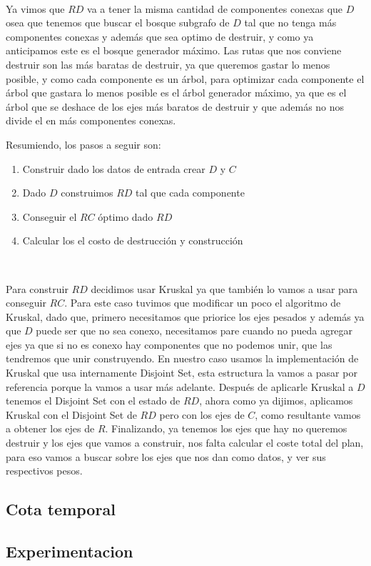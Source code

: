 \\
\par
Ya vimos que $RD$ va a tener la misma cantidad de componentes conexas que $D$ osea que tenemos que buscar el bosque subgrafo de $D$ tal que no tenga más componentes conexas y además que sea optimo de destruir, y como ya anticipamos este es el bosque generador máximo. Las rutas que nos conviene destruir son las más baratas de destruir, ya que queremos gastar lo menos posible, y como cada componente es un árbol, para optimizar cada componente el árbol que gastara lo menos posible es el árbol generador máximo, ya que es el árbol que se deshace de los ejes más baratos de destruir y que  además no nos divide el en más componentes conexas.
\\
\par
Resumiendo, los pasos a seguir son:
\begin{enumerate}
\item Construir dado los datos de entrada crear $D$ y $C$
\item Dado $D$ construimos $RD$ tal que cada componente
\item Conseguir el $RC$ óptimo dado $RD$
\item Calcular los el costo de destrucción y construcción
\end{enumerate}
\\
\par 
Para construir $RD$ decidimos usar Kruskal ya que también lo vamos a usar para conseguir $RC$. Para este caso tuvimos que modificar un poco el algoritmo de Kruskal, dado que, primero necesitamos que priorice los ejes pesados y además ya que $D$ puede ser que no sea conexo, necesitamos pare cuando no pueda agregar ejes ya que si no es conexo hay componentes que no podemos unir, que las tendremos que unir construyendo. En nuestro caso usamos la implementación de Kruskal que usa internamente Disjoint Set, esta estructura la vamos a pasar por referencia porque la vamos a usar más adelante.
Después de aplicarle Kruskal a $D$ tenemos el Disjoint Set con el estado de $RD$, ahora como ya dijimos, aplicamos Kruskal con el Disjoint Set de $RD$ pero con los ejes de $C$, como resultante vamos a obtener los ejes de $R$. Finalizando, ya tenemos los ejes que hay no queremos destruir y los ejes que vamos a construir, nos falta calcular el coste total del plan, para eso vamos a buscar sobre los ejes que nos dan como datos, y ver sus respectivos pesos.



\subsection{Cota temporal}

\subsection{Experimentacion}

\pagebreak